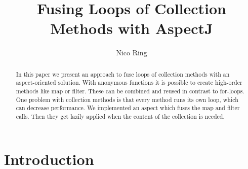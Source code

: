 \documentclass[runningheads,a4paper]{llncs}
\begin{document}


\title{Fusing Loops of Collection Methods with AspectJ}

\author{Nico Ring}

\maketitle

\begin{abstract}
In this paper we present an approach to fuse loops of collection methods with an aspect-oriented solution.
With anonymous functions it is possible to create high-order methods like map or filter. These can be combined and reused in contrast to for-loops.
One problem with collection methods is that every method runs its own loop, which can decrease performance. We implemented an aspect which fuses the map and filter calls.
Then they get lazily applied when the content of the collection is needed.

\end{abstract}


\section{Introduction}\label{sec:intro}
\end{document}
